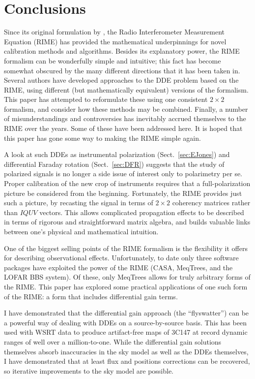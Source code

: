 \documentclass[]{aa}
\begin{document}
\section{Conclusions}

Since its original formulation by \citet{ME1}, the Radio Interferometer Measurement Equation (RIME) has 
provided the mathematical underpinnings for novel calibration methods and algorithms. Besides its explanatory power, the RIME formalism can be wonderfully simple and intuitive; this fact has become somewhat obscured by the many different directions that it has been taken in. Several authors have developed approaches to the DDE problem based on the RIME, using different (but mathematically equivalent) versions of the formalism. This paper has attempted to reformulate these using one consistent $2\times2$ formalism, and consider how these methods may be combined. Finally, a number of misunderstandings and controversies has inevitably accrued themselves to the RIME over the years. Some of these have been addressed here. It is hoped that this paper has gone some way to making the RIME simple again. 

A look at such DDEs as instrumental polarization (Sect.~\ref{sec:EJones}) and differential Faraday rotation (Sect.~\ref{sec:DFR}) suggests that the study of polarized signals is no longer a side issue of interest only to polarimetry per se. Proper calibration of the new crop of instruments requires that a full-polarization picture be considered from the beginning. Fortunately, the RIME provides just such a picture, by recasting the signal in terms of $2\times2$ coherency matrices rather than $IQUV$ vectors. This allows complicated propagation effects to be described in terms of rigorous and straightforward matrix algebra, and builds valuable links between one's physical and mathematical intuition. 

One of the biggest selling points of the RIME formalism is the flexibility it offers for describing observational effects. Unfortunately, to date only three software packages have exploited the power of the RIME (CASA, MeqTrees, and the LOFAR BBS system). Of these, only MeqTrees allows for truly arbitrary forms of the RIME. This paper has explored some practical applications of one such form of the RIME: a form that includes differential gain terms.

I have demonstrated that the differential gain approach (the ``flyswatter'') can be a powerful way of dealing with DDEs on a source-by-source basis. This has been used with WSRT data to produce artifact-free maps of 3C147 at record dynamic ranges of well over a million-to-one. While the differential gain solutions themselves absorb inaccuracies in the sky model as well as the DDEs themselves, I have demonstrated that at least flux and positions corrections can be recovered, so iterative improvements to the sky model are possible. 
\end{document}

